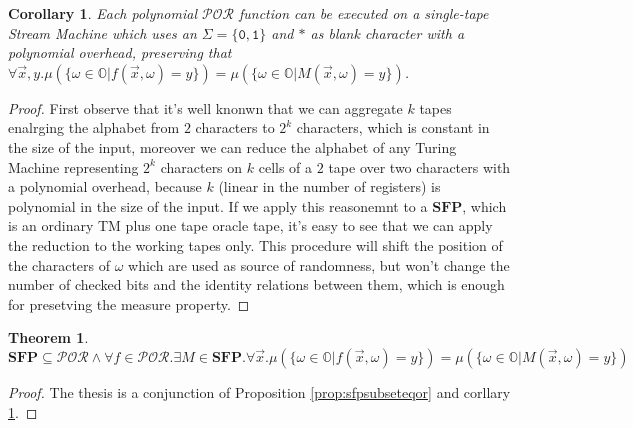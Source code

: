 \documentclass[10pt]{amsart}
\newcommand{\SFP}{\mathbf{SFP}}
\newcommand{\POR}{\mathcal{POR}}
\newcommand{\zero}{\mathtt{0}}
\newcommand{\one}{\mathtt{1}}
\newcommand{\OO}{\mathbb{O}}
\newtheorem{corollary}{Corollary}
\newtheorem{theorem}{Theorem}
\begin{document}
\begin{corollary}
\label{prop:porsubseteqsfp}
Each polynomial $\POR$ function can be executed on a single-tape Stream Machine which uses an $\Sigma=\{\zero, \one\}$ and $*$ as blank character with a polynomial overhead, preserving that$\forall \vec x, y. \mu(\{\omega \in \OO | f(\vec x, \omega) = y\})=\mu(\{\omega \in \OO| M(\vec x, \omega) = y\})$. 
\end{corollary}
\begin{proof}
First observe that it's well knonwn that we can aggregate $k$ tapes enalrging the alphabet from $2$ characters to $2^k$ characters, which is constant in the size of the input, moreover we can reduce the alphabet of any Turing Machine representing $2^k$ characters on $k$ cells of a $2$ tape over two characters with a polynomial overhead, because $k$ (linear in the number of registers) is polynomial in the size of the input. If we apply this reasonemnt to a $\SFP$, which is an ordinary TM plus one tape oracle tape, it's easy to see that we can apply the reduction to the working tapes only. This procedure will shift the position of the characters of $\omega$ which are used as source of randomness, but won't change the number of checked bits and the identity relations between them, which is enough for presetving the measure property.  
\end{proof}

\begin{theorem}
\label{thm:por=sfp}
$\SFP\subseteq\POR\land \forall f \in \POR. \exists M \in \SFP.\forall \vec x. \mu(\{\omega \in \OO | f(\vec x, \omega) = y\})=\mu(\{\omega \in \OO| M(\vec x, \omega) = y\})$
\end{theorem}
\begin{proof}
The thesis is a conjunction of Proposition \ref{prop:sfpsubseteqor} and corllary \ref{prop:porsubseteqsfp}.
\end{proof}
\end{document}
